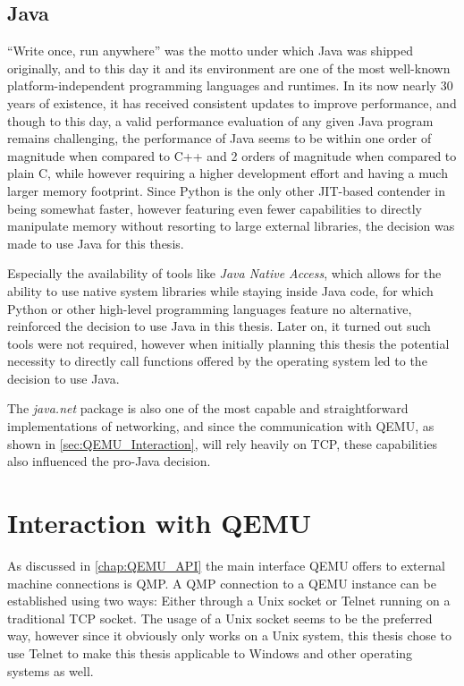 \subsection{Java}
\enquote{Write once, run anywhere}\cite{WORA} was the motto under which Java was shipped originally,
and to this day it and its environment are one of the most well-known platform-independent
programming languages and runtimes.
In its now nearly 30 years of existence, it has received consistent updates to improve performance,
and though to this day, a valid performance evaluation of any given Java program remains challenging\cite{Java_Benchmarking},
the performance of Java seems to be within one order of magnitude when compared to C++ and 2 orders of magnitude when compared to plain C,
while however requiring a higher development effort and having a much larger memory footprint\cite{Java_Performance}.
Since Python is the only other JIT-based contender in  being somewhat faster,
however featuring even fewer capabilities to directly manipulate memory without
resorting to large external libraries, the decision was made to use Java for this thesis.

\label{JNA}
Especially the availability of tools like \emph{Java Native Access}\cite{JNA},
which allows for the ability to use native system libraries while staying inside Java code,
for which Python or other high-level programming languages feature no alternative,
reinforced the decision to use Java in this thesis.
Later on, it turned out such tools were not required, however when initially planning this thesis
the potential necessity to directly call functions offered by the operating system led to the decision to use Java.

The \emph{java.net} package is also one of the most capable and straightforward implementations of networking,
and since the communication with QEMU, as shown in \autoref{sec:QEMU_Interaction}, will rely heavily on TCP,
these capabilities also influenced the pro-Java decision.

\section{Interaction with QEMU}\label{sec:QEMU_Interaction}
As discussed in \autoref{chap:QEMU_API} the main interface QEMU offers to external machine connections is QMP.
A QMP connection to a QEMU instance can be established using two ways:
Either through a Unix socket or Telnet running on a traditional TCP socket.
The usage of a Unix socket seems to be the preferred way,
however since it obviously only works on a Unix system,
this thesis chose to use Telnet to make this thesis applicable
to Windows and other operating systems as well.

